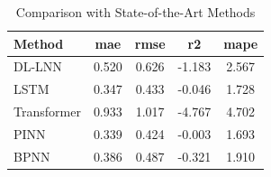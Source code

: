 \begin{table}[htbp]
\centering
\caption{Comparison with State-of-the-Art Methods}
\label{tab:table1_synthetic_results}
\begin{tabular}{lcccc}
\toprule
Method & \textbf{mae} & \textbf{rmse} & \textbf{r2} & \textbf{mape} \\
\midrule
DL-LNN & 0.520 & 0.626 & -1.183 & 2.567 \\
LSTM & 0.347 & 0.433 & -0.046 & 1.728 \\
Transformer & 0.933 & 1.017 & -4.767 & 4.702 \\
PINN & 0.339 & 0.424 & -0.003 & 1.693 \\
BPNN & 0.386 & 0.487 & -0.321 & 1.910 \\
\bottomrule
\end{tabular}
\end{table}